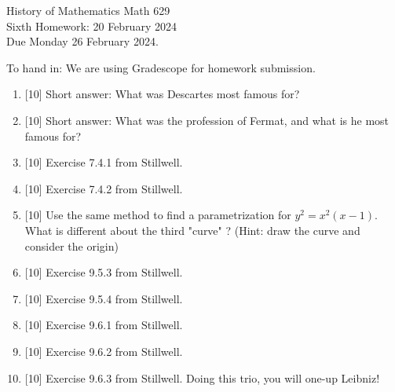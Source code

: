 \documentclass[12pt]{article}
\begin{document}
\LARGE 
\noindent
{\color{Maroon}History of Mathematics \hfill Math 629}\vspace{2pt}\\
\large
Sixth Homework: \hfill 20 February 2024\\
Due Monday 26 February 2024.
\normalsize\vspace{10pt}

To hand in: We are using Gradescope for homework submission.


\begin{enumerate}


\item {[10]} {\sc Short answer:}
  What was Descartes most famous for?

\item {[10]} {\sc Short answer:}
  What was the profession of Fermat, and what is he most famous for?


\item  {[10]}
     Exercise 7.4.1 from Stillwell.

\item  {[10]}
     Exercise 7.4.2 from Stillwell.

\item  {[10]}
  Use the same method to find a parametrization for $y^2=x^2(x-1)$.
  What is different about the third "curve" ? (Hint: draw the curve and consider the origin) 

 
\item  {[10]}
     Exercise 9.5.3 from Stillwell.

\item  {[10]}
     Exercise 9.5.4 from Stillwell.

\item  {[10]}
     Exercise 9.6.1 from Stillwell.

\item  {[10]}
     Exercise 9.6.2 from Stillwell.

\item  {[10]}
     Exercise 9.6.3 from Stillwell.  Doing this trio, you will one-up Leibniz!


     


\end{enumerate}
\end{document}
